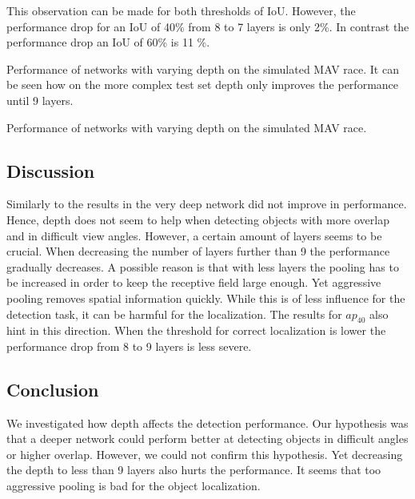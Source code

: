 This observation can be made for both thresholds of \ac{IoU}. However, the performance drop for an \ac{IoU} of 40\% from 8 to 7 layers is only 2\%. In contrast the performance drop an \ac{IoU} of 60\% is 11 \%.

\begin{table}[hbtp]
	\centering
	
	\caption{Performance of networks with varying depth on the simulated \ac{MAV} race. It can be seen how on the more complex test set depth only improves the performance until 9 layers.}
	\label{tab:depth}
\end{table}

\begin{table}[hbtp]
	\centering
	
	\caption{Performance of networks with varying depth on the simulated \ac{MAV} race. }
	\label{tab:width}
\end{table}



\subsection{Discussion}

Similarly to the results in  the very deep network did not improve in performance. Hence, depth does not seem to help when detecting objects with more overlap and in difficult view angles. However, a certain amount of layers seems to be crucial. When decreasing the number of layers further than 9 the performance gradually decreases. A possible reason is that with less layers the pooling has to be increased in order to keep the receptive field large enough. Yet aggressive pooling removes spatial information quickly. While this is of less influence for the detection task, it can be harmful for the localization. The results for $ap_{40}$ also hint in this direction. When the threshold for correct localization is lower the performance drop from 8 to 9 layers is less severe.


\subsection{Conclusion}

We investigated how depth affects the detection performance. Our hypothesis was that a deeper network could perform better at detecting objects in difficult angles or higher overlap. However, we could not confirm this hypothesis. Yet decreasing the depth to less than 9 layers also hurts the performance. It seems that too aggressive pooling is bad for the object localization.

